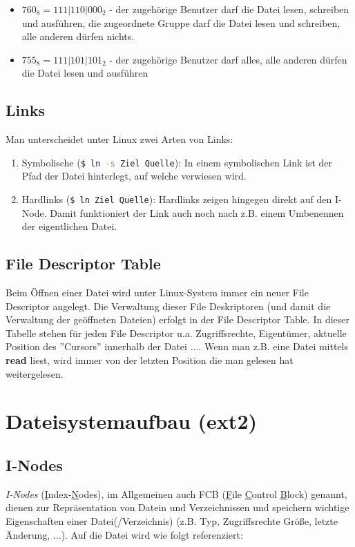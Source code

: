 \documentclass[11pt]{scrartcl}
\begin{document}
\begin{itemize} %
	\item{$760_8=111|110|000_2$ - der zugehörige Benutzer darf die Datei lesen, schreiben und ausführen, die zugeordnete Gruppe darf die Datei lesen und schreiben, alle anderen dürfen nichts.}
	\item{$755_8=111|101|101_2$ - der zugehörige Benutzer darf alles, alle anderen dürfen die Datei lesen und ausführen}
\end{itemize}

\subsection{Links}
Man unterscheidet unter Linux zwei Arten von Links:

\begin{enumerate}
	\item{Symbolische (\lstinline[language=Bash]{$ ln -s Ziel Quelle}): In einem symbolischen Link ist der Pfad der Datei hinterlegt, auf welche verwiesen wird.}
	\item{Hardlinks (\lstinline[language=Bash]{$ ln Ziel Quelle}): Hardlinks zeigen hingegen direkt auf den I-Node. Damit funktioniert der Link auch noch nach z.B. einem Umbenennen der eigentlichen Datei.}
\end{enumerate}

\subsection{File Descriptor Table}
Beim Öffnen einer Datei wird unter Linux-System immer ein neuer File Descriptor angelegt. Die Verwaltung dieser File Deskriptoren (und damit die Verwaltung der geöffneten Dateien) erfolgt in der File Descriptor Table. In dieser Tabelle stehen für jeden File Descriptor u.a. Zugriffsrechte, Eigentümer, aktuelle Position des ''Cursors'' innerhalb der Datei $\ldots$. Wenn man z.B. eine Datei mittels \textbf{read} liest, wird immer von der letzten Position die man gelesen hat weitergelesen.

\section{Dateisystemaufbau (ext2)}
\subsection{I-Nodes}
\textit{I-Nodes} (\underline Index-\underline Nodes), im Allgemeinen auch FCB (\underline File \underline Control \underline Block) genannt, dienen zur Repräsentation von Datein und Verzeichnissen und speichern wichtige Eigenschaften einer Datei(/Verzeichnis) (z.B. Typ, Zugriffsrechte Größe, letzte Änderung, $\ldots$). Auf die Datei wird wie folgt referenziert:
\end{document}
